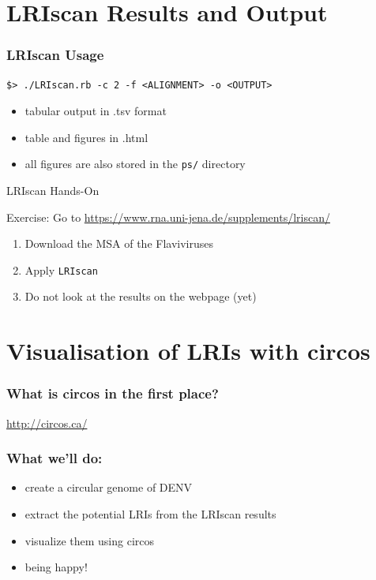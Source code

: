 \section[Results]{LRIscan Results and Output}

\begin{frame}[c, fragile]\frametitle{LRIscan Usage}
	\begin{lstlisting}
$> ./LRIscan.rb -c 2 -f <ALIGNMENT> -o <OUTPUT>
	\end{lstlisting}

\begin{itemize}
	\item tabular output in .tsv format
	\item table and figures in .html
	\item all figures are also stored in the \texttt{ps/} directory
\end{itemize}
\end{frame}

\begin{frame}[c,fragile]{LRIscan Hands-On}
  \begin{block}{Exercise:}
    Go to \url{https://www.rna.uni-jena.de/supplements/lriscan/}\\
    \begin{enumerate}
      \item Download the MSA of the Flaviviruses
      \item Apply \texttt{LRIscan}
      \item Do not look at the results on the webpage (yet)
    \end{enumerate}
  \end{block}
\end{frame}

\section[circos]{Visualisation of LRIs with circos}

\begin{frame}[c]\frametitle{What is circos in the first place?}
	\centering
	\url{http://circos.ca/}
\end{frame}

\begin{frame}[c]\frametitle{What we'll do:}
	\begin{itemize}
		\item create a circular genome of DENV
		\item extract the potential LRIs from the LRIscan results
		\item visualize them using circos \\[2em]
		\item<2> being happy! 
	\end{itemize}
\end{frame}

